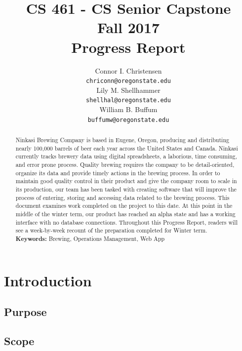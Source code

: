\documentclass[draftclsnofoot,onecolumn,letterpaper,10pt,compsoc]{IEEEtran}
\title{CS 461 - CS Senior Capstone
	\\Fall 2017
	\\Progress Report
}
\author{
	Connor I. Christensen \\
	\texttt{chriconn@oregonstate.edu}
	\\
	Lily M. Shellhammer \\
	\texttt{shellhal@oregonstate.edu}
	\\
	William B. Buffum \\
	\texttt{buffumw@oregonstate.edu}
}
\begin{document}
\begin{titlingpage}
    \maketitle
    \begin{abstract}
			Ninkasi Brewing Company is based in Eugene, Oregon, producing and distributing nearly 100,000 barrels of beer each year across the United States and Canada.
			Ninkasi currently tracks brewery data using digital spreadsheets, a laborious, time consuming, and error prone process.
			Quality brewing requires the company to be detail-oriented, organize its data and provide timely actions in the brewing process.
			In order to maintain good quality control in their product and give the company room to scale in its production, our team has been tasked with creating software that will improve the process of entering, storing and accessing data related to the brewing process.
			This document examines work completed on the project to this date.
			At this point in the middle of the winter term, our product has reached an alpha state and has a working interface with no database connections.
			Throughout this Progress Report, readers will see a week-by-week recount of the preparation completed for Winter term.
			\\
			\textbf{Keywords:} Brewing, Operations Management, Web App
    \end{abstract}
		\pagebreak
		\tableofcontents
\end{titlingpage}


\section{Introduction}
\subsection{Purpose}
\subsection{Scope}
\end{document}
